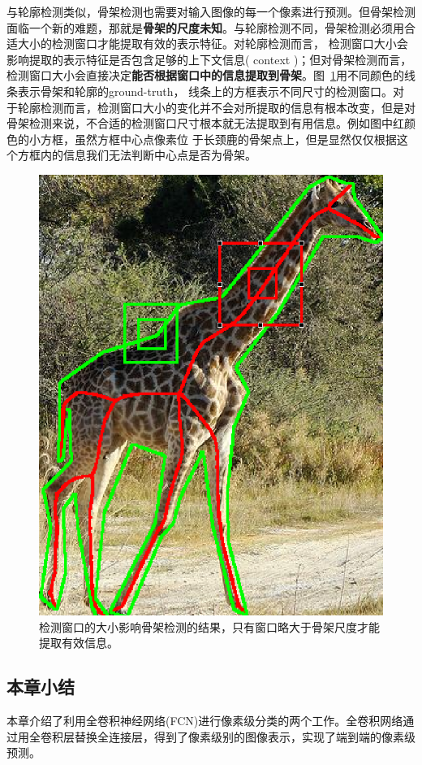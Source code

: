 \documentclass[UTF8]{ctexart}
\numberwithin{equation}{section} %
\numberwithin{table}{section} %
\begin{document}
与轮廓检测类似，骨架检测也需要对输入图像的每一个像素进行预测。但骨架检测面临一个新的难题，那就是\textbf{骨架的尺度未知}。与轮廓检测不同，骨架检测必须用合适大小的检测窗口才能提取有效的表示特征。对轮廓检测而言，
检测窗口大小会影响提取的表示特征是否包含足够的上下文信息( context )；但对骨架检测而言，检测窗口大小会直接决定\textbf{能否根据窗口中的信息提取到骨架}。图~\ref{fig:edge_vs_sk}用不同颜色的线条表示骨架和轮廓的ground-truth，
线条上的方框表示不同尺寸的检测窗口。对于轮廓检测而言，检测窗口大小的变化并不会对所提取的信息有根本改变，但是对骨架检测来说，不合适的检测窗口尺寸根本就无法提取到有用信息。例如图中红颜色的小方框，虽然方框中心点像素位
于长颈鹿的骨架点上，但是显然仅仅根据这个方框内的信息我们无法判断中心点是否为骨架。
\begin{figure}[H]
\centering
\includegraphics[scale=0.3]{figures/edge_vs_sk.png}
\caption{检测窗口的大小影响骨架检测的结果，只有窗口略大于骨架尺度才能提取有效信息。
}
\label{fig:edge_vs_sk}
\end{figure}
\subsection{本章小结}
本章介绍了利用全卷积神经网络(FCN)进行像素级分类的两个工作。全卷积网络通过用全卷积层替换全连接层，得到了像素级别的图像表示，实现了端到端的像素级预测。
\end{document}
